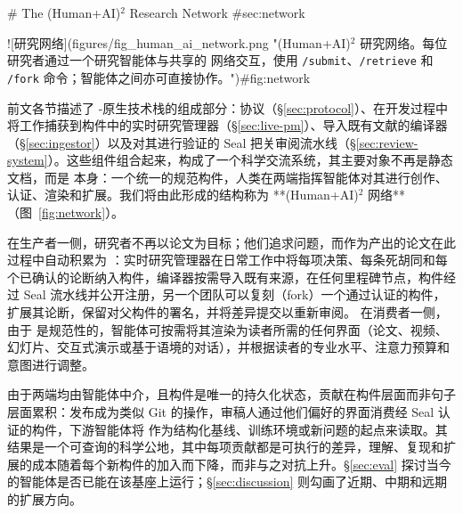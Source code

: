 \begin{markdown}
# The (Human+AI)$^{2}$ Research Network {#sec:network}

![研究网络](figures/fig_human_ai_network.png "(Human+AI)$^{2}$ 研究网络。每位研究者通过一个研究智能体与共享的 \ara{} 网络交互，使用 \texttt{/submit}、\texttt{/retrieve} 和 \texttt{/fork} 命令；智能体之间亦可直接协作。"){#fig:network}

前文各节描述了 \ara{}-原生技术栈的组成部分：协议（\S\ref{sec:protocol}）、在开发过程中将工作捕获到构件中的实时研究管理器（\S\ref{sec:live-pm}）、导入既有文献的编译器（\S\ref{sec:ingestor}）以及对其进行验证的 Seal 把关审阅流水线（\S\ref{sec:review-system}）。这些组件组合起来，构成了一个科学交流系统，其主要对象不再是静态文档，而是 \ara{} 本身：一个统一的规范构件，人类在两端指挥智能体对其进行创作、认证、渲染和扩展。我们将由此形成的结构称为 **(Human+AI)$^{2}$ 网络**（图~\ref{fig:network}）。

在生产者一侧，研究者不再以论文为目标；他们追求问题，而作为产出的论文在此过程中自动积累为 \ara{}：实时研究管理器在日常工作中将每项决策、每条死胡同和每个已确认的论断纳入构件，编译器按需导入既有来源，在任何里程碑节点，构件经过 Seal 流水线并公开注册，另一个团队可以复刻（fork）一个通过认证的构件，扩展其论断，保留对父构件的署名，并将差异提交以重新审阅。
在消费者一侧，由于 \ara{} 是规范性的，智能体可按需将其渲染为读者所需的任何界面（论文、视频、幻灯片、交互式演示或基于语境的对话），并根据读者的专业水平、注意力预算和意图进行调整。

由于两端均由智能体中介，且构件是唯一的持久化状态，贡献在构件层面而非句子层面累积：发布成为类似 Git 的操作，审稿人通过他们偏好的界面消费经 Seal 认证的构件，下游智能体将 \ara{} 作为结构化基线、训练环境或新问题的起点来读取。其结果是一个可查询的科学公地，其中每项贡献都是可执行的差异，理解、复现和扩展的成本随着每个新构件的加入而下降，而非与之对抗上升。\S\ref{sec:eval} 探讨当今的智能体是否已能在该基座上运行；\S\ref{sec:discussion} 则勾画了近期、中期和远期的扩展方向。
\end{markdown}
